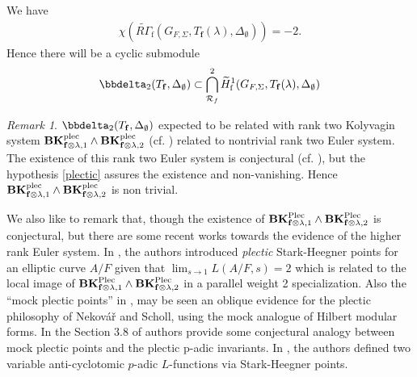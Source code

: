 \documentclass[10pt]{amsart}
\numberwithin{equation}{section}
\theoremstyle{definition}
\theoremstyle{remark} %
\newtheorem{rmk}[thm]{Remark}
\newcommand{\Log}{\operatorname{Log}}
\newcommand{\f}{\mathbf{f}}
\newcommand{\R}{\mathcal{R}}
\begin{document}
		\subsubsection{}
		\label{7.1.2}
		We have \begin{align}
			\label{7.1}
			\chi(\widetilde{R\Gamma}_{\mathrm{f}}(G_{F, \Sigma}, T_\f(\lambda), \Delta_\emptyset)) = -2.
		\end{align} 
		Hence there will be a cyclic submodule 
		$$\bbdelta_2(T_\f, \Delta_\emptyset) \subset \bigcap^2_{\R_f}\widetilde{H}^1_{\mathrm{f}}(G_{F,\Sigma},T_\f(\lambda),\Delta_\emptyset)$$
		\begin{rmk}
			\label{gen_kato_class}
			$\bbdelta_2(T_\f, \Delta_\emptyset)$ expected to be related with rank two Kolyvagin system $\mathbf{BK}^{\rm plec}_{\f \otimes \lambda, 1} \wedge \mathbf{BK}^{\rm plec}_{\f \otimes \lambda, 2} $ (cf. \cite[Section 5]{BSS18}) related to nontrivial rank two Euler system. The existence of this rank two Euler system is conjectural (cf. \cite[]{LZ20local}), but the hypothesis \ref{plectic} assures the existence and non-vanishing. Hence $\mathbf{BK}^{\rm plec}_{\f \otimes \lambda, 1} \wedge \mathbf{BK}^{\rm plec}_{\f \otimes \lambda, 2} $ is non trivial.
			
			We also like to remark that, though the existence of $ \mathbf{BK}^{\rm Plec}_{\f\otimes \lambda,1} \wedge \mathbf{BK}^{\rm Plec}_{\f\otimes \lambda,2}$ is conjectural, but there are some recent works towards the evidence of the higher rank Euler system. In \cite{fornea23plectic}, the authors introduced \emph{plectic} Stark-Heegner points for an elliptic curve $ A/F $ given that $ \lim_{s\to 1 }L(A/F,s) = 2 $ which is related to the local image of $ \mathbf{BK}^{\rm Plec}_{\f\otimes \lambda,1} \wedge \mathbf{BK}^{\rm Plec}_{\f\otimes \lambda,2}$ in a parallel weight 2 specialization. Also the \enquote{mock plectic points} in \cite{Darmon_Fornea_2025}, may be seen an oblique evidence for the plectic philosophy of Nekovář and Scholl, using the mock analogue of Hilbert modular forms. In the Section 3.8 of \cite{Darmon_Fornea_2025} authors provide some conjectural analogy between mock plectic points and the plectic p-adic
			invariants. In \cite{hernandez2022plectic}, the authors defined two variable anti-cyclotomic $ p $-adic $ L $-functions via Stark-Heegner points.
		\end{rmk}
\end{document}

